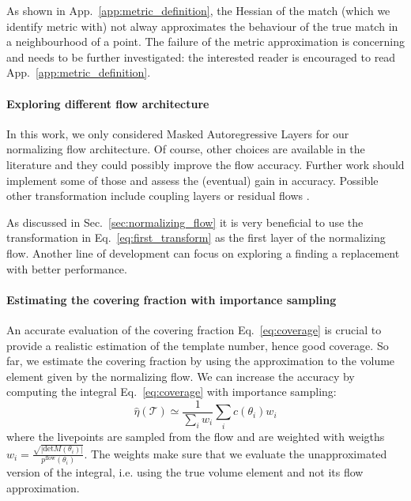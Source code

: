 \documentclass[twocolumn,showpacs,preprintnumbers,nofootinbib,prd,
superscriptaddress,10pt]{revtex4-2}
\begin{document}
As shown in App.~\ref{app:metric_definition}, the Hessian of the match (which we identify metric with) not alway approximates the behaviour of the true match in a neighbourhood of a point.
The failure of the metric approximation is concerning and needs to be further investigated: the interested reader is encouraged to read App.~\ref{app:metric_definition}.

\paragraph{Exploring different flow architecture}

In this work, we only considered Masked Autoregressive Layers for our normalizing flow architecture. Of course, other choices are available in the literature and they could possibly improve the flow accuracy. Further work should implement some of those and assess the (eventual) gain in accuracy.
Possible other transformation include coupling layers \cite{Dinh2014NICENI,Dinh2016DensityEU} or residual flows \cite{NIPS1999_e6384711, Behrmann2018InvertibleRN}.

As discussed in Sec.~\ref{sec:normalizing_flow} it is very beneficial to use the transformation in Eq.~\eqref{eq:first_transform} as the first layer of the normalizing flow. Another line of development can focus on exploring a finding a replacement with better performance.

\paragraph{Estimating the covering fraction with importance sampling}

An accurate evaluation of the covering fraction Eq.~\eqref{eq:coverage} is crucial to provide a realistic estimation of the template number, hence good coverage.
So far, we estimate the covering fraction by using the approximation to the volume element given by the normalizing flow.
We can increase the accuracy by computing the integral Eq.~\eqref{eq:coverage} with importance sampling:
\begin{equation}\label{eq:coverage_estimate_IS}
	\hat{\eta}(\mathcal{T}) \simeq \frac{1}{\sum_i w_i} \sum_i c(\theta_i) w_i 
\end{equation}
where the livepoints are sampled from the flow and are weighted with weigths $w_i = \frac{\sqrt{|\text{det}M(\theta_i)|}}{p^\text{flow}(\theta_i)}$.
The weights make sure that we evaluate the unapproximated version of the integral, i.e. using the true volume element and not its flow approximation.
\end{document}
